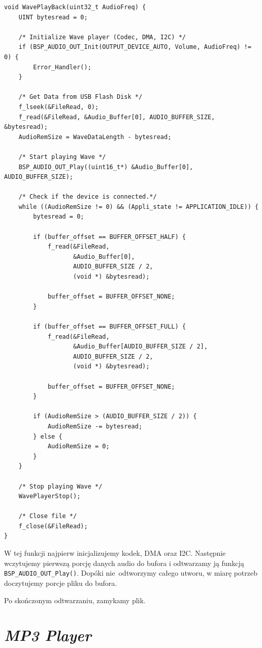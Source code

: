\documentclass[12pt,a4paper]{article}
\begin{document}
\begin{lstlisting}
void WavePlayBack(uint32_t AudioFreq) {
    UINT bytesread = 0;

    /* Initialize Wave player (Codec, DMA, I2C) */
    if (BSP_AUDIO_OUT_Init(OUTPUT_DEVICE_AUTO, Volume, AudioFreq) != 0) {
        Error_Handler();
    }

    /* Get Data from USB Flash Disk */
    f_lseek(&FileRead, 0);
    f_read(&FileRead, &Audio_Buffer[0], AUDIO_BUFFER_SIZE, &bytesread);
    AudioRemSize = WaveDataLength - bytesread;

    /* Start playing Wave */
    BSP_AUDIO_OUT_Play((uint16_t*) &Audio_Buffer[0], AUDIO_BUFFER_SIZE);

    /* Check if the device is connected.*/
    while ((AudioRemSize != 0) && (Appli_state != APPLICATION_IDLE)) {
        bytesread = 0;

        if (buffer_offset == BUFFER_OFFSET_HALF) {
            f_read(&FileRead,
                   &Audio_Buffer[0],
                   AUDIO_BUFFER_SIZE / 2,
                   (void *) &bytesread);

            buffer_offset = BUFFER_OFFSET_NONE;
        }

        if (buffer_offset == BUFFER_OFFSET_FULL) {
            f_read(&FileRead,
                   &Audio_Buffer[AUDIO_BUFFER_SIZE / 2],
                   AUDIO_BUFFER_SIZE / 2,
                   (void *) &bytesread);

            buffer_offset = BUFFER_OFFSET_NONE;
        }

        if (AudioRemSize > (AUDIO_BUFFER_SIZE / 2)) {
            AudioRemSize -= bytesread;
        } else {
            AudioRemSize = 0;
        }
    }

    /* Stop playing Wave */
    WavePlayerStop();

    /* Close file */
    f_close(&FileRead);
}
\end{lstlisting}

W tej funkcji najpierw inicjalizujemy kodek, DMA oraz I2C. Następnie wczytujemy pierwszą porcję danych audio do bufora i odtwarzamy ją funkcją \texttt{BSP\_AUDIO\_OUT\_Play()}. Dopóki nie~odtworzymy całego utworu, w miarę potrzeb doczytujemy porcje pliku do bufora.

Po skończonym odtwarzaniu, zamykamy plik.

\section{\emph{MP3 Player}}
\end{document}

